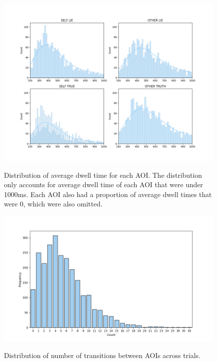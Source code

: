 \documentclass[man, floatsintext]{apa7}
\begin{document}
\begin{figure}[H]
	\caption{Distribution of average dwell time for each AOI. The distribution only accounts for average dwell time of each AOI that were under 1000ms. Each AOI also had a proportion of average dwell times that were 0, which were also omitted.}
	\includegraphics[width=\linewidth]{../plots/Dwell/DwellDistPlot.png}
	\label{fig:DwellDistPlot}
\end{figure}

\begin{figure}[H]
	\caption{Distribution of number of transitions between AOIs across trials.}
	\includegraphics[width=\linewidth]{../plots/Dwell/N_TransitionsDistPlot.png}
	\label{fig:NTransitionsDistPlot}
\end{figure}
\end{document}
